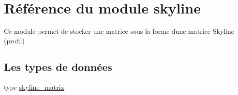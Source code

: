\hypertarget{namespaceskyline}{}\section{Référence du module skyline}
\label{namespaceskyline}


Ce module permet de stocker une matrice sous la forme d\textquotesingle{}une matrice Skyline (profil)  


\subsection*{Les types de données}
\begin{DoxyCompactItemize}
\item 
type \hyperlink{structskyline_1_1skyline__matrix}{skyline\+\_\+matrix}
\end{DoxyCompactItemize}
